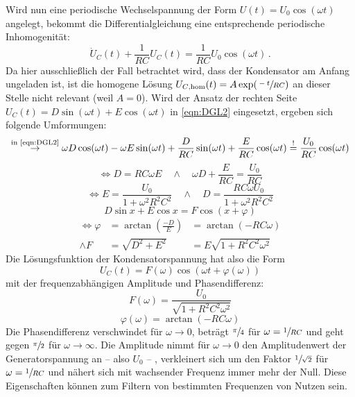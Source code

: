Wird nun eine periodische Wechselspannung der Form $U(t)=U_0\cos(\omega t)$ angelegt, bekommt die Differentialgleichung 
eine entsprechende periodische Inhomogenität:
\begin{equation}
    \dot{U}_C(t) + \frac{1}{RC}U_C(t) = \frac{1}{RC}U_0 \cos(\omega t)\,.
    \label{eqn:DGL2}
\end{equation}
Da hier ausschließlich der Fall betrachtet wird, dass der Kondensator am Anfang ungeladen ist, ist die homogene Lösung 
$U_{C\text{,hom}}(t)=A\exp(\sfrac{-t}{RC})$ an dieser Stelle nicht relevant (weil ${A=0}$). 
Wird der Ansatz der rechten Seite ${U_C(t)=D\sin(\omega t) + E\cos(\omega t)}$ in \eqref{eqn:DGL2} eingesetzt, ergeben sich folgende Umformungen: 
\begin{equation}
    \stackrel{\text{in \eqref{eqn:DGL2}}}{\to} \omega D\cos(\omega t)-\omega E\sin(\omega t) + 
    \frac{D}{RC}\sin(\omega t) + \frac{E}{RC}\cos(\omega t) \stackrel{!}{=} \frac{U_0}{RC}\cos(\omega t)
\end{equation}
\begin{equation}
    \Leftrightarrow D=RC\omega E \quad \land \quad
    \omega D + \frac{E}{RC} = \frac{U_0}{RC}
\end{equation}
\begin{equation}
    \Leftrightarrow E=\frac{U_0}{1+\omega^2R^2C^2} \quad \land \quad D=\frac{RC\omega U_0}{1+\omega^2R^2C^2}
\end{equation}
\begin{equation}
    D\sin x + E\cos x = F\cos(x+\varphi)
\end{equation}
\begin{align}
    \Leftrightarrow \varphi&=\arctan(\frac{-D}{E}) &= \arctan(-RC\omega)  \\
    \land F&=\sqrt{D^2+E^2}&=E\sqrt{1+R^2C^2\omega^2}
\end{align}
Die Lösungsfunktion der Kondensatorspannung hat also die Form 
\begin{equation}
    U_C(t)=F(\omega)\cos(\omega t +\varphi(\omega))
    \label{eqn:U_C_AC}
\end{equation}
mit der frequenzabhängigen Amplitude und Phasendifferenz:
\begin{equation}
    F(\omega)=\frac{U_0}{\sqrt{1+R^2C^2\omega ^2}}
    \label{eqn:ampl_omega}
\end{equation}
\begin{equation}
    \varphi(\omega)=\arctan(-RC\omega)
    \label{eqn:phas_diff_omega}
\end{equation}
Die Phasendifferenz verschwindet für ${\omega \to 0}$, beträgt $\sfrac{\pi}{4}$ für ${\omega=\sfrac{1}{RC}}$ und geht gegen 
$\sfrac{\pi}{2}$ für ${\omega \to \infty}$. 
Die Amplitude nimmt für ${\omega \to 0}$ den Amplitudenwert der Generatorspannung an -- also $U_0$ -- , verkleinert sich 
um den Faktor $\sfrac{1}{\sqrt{2}}$ für ${\omega = \sfrac{1}{RC}}$ und nähert sich mit wachsender Frequenz immer mehr der Null. 
Diese Eigenschaften können zum Filtern von bestimmten Frequenzen von Nutzen sein. 
\FloatBarrier

